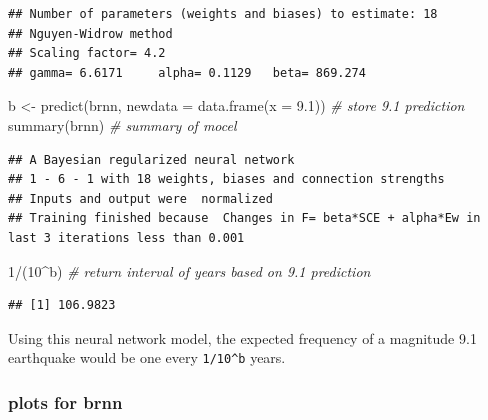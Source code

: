\documentclass[
]{article}
\newenvironment{Shaded}{\begin{snugshade}}{\end{snugshade}}
\newcommand{\AttributeTok}[1]{\textcolor[rgb]{0.77,0.63,0.00}{#1}}
\newcommand{\CommentTok}[1]{\textcolor[rgb]{0.56,0.35,0.01}{\textit{#1}}}
\newcommand{\DecValTok}[1]{\textcolor[rgb]{0.00,0.00,0.81}{#1}}
\newcommand{\FloatTok}[1]{\textcolor[rgb]{0.00,0.00,0.81}{#1}}
\newcommand{\FunctionTok}[1]{\textcolor[rgb]{0.00,0.00,0.00}{#1}}
\newcommand{\NormalTok}[1]{#1}
\newcommand{\OtherTok}[1]{\textcolor[rgb]{0.56,0.35,0.01}{#1}}
\newcommand{\SpecialCharTok}[1]{\textcolor[rgb]{0.00,0.00,0.00}{#1}}
\begin{document}
\begin{verbatim}
## Number of parameters (weights and biases) to estimate: 18 
## Nguyen-Widrow method
## Scaling factor= 4.2 
## gamma= 6.6171     alpha= 0.1129   beta= 869.274
\end{verbatim}

\begin{Shaded}
\begin{Highlighting}[]
\NormalTok{b }\OtherTok{\textless{}{-}} \FunctionTok{predict}\NormalTok{(brnn, }\AttributeTok{newdata =} \FunctionTok{data.frame}\NormalTok{(}\AttributeTok{x =} \FloatTok{9.1}\NormalTok{)) }\CommentTok{\# store 9.1 prediction}
\FunctionTok{summary}\NormalTok{(brnn)                                     }\CommentTok{\# summary of mocel}
\end{Highlighting}
\end{Shaded}

\begin{verbatim}
## A Bayesian regularized neural network 
## 1 - 6 - 1 with 18 weights, biases and connection strengths
## Inputs and output were  normalized
## Training finished because  Changes in F= beta*SCE + alpha*Ew in last 3 iterations less than 0.001
\end{verbatim}

\begin{Shaded}
\begin{Highlighting}[]
\DecValTok{1}\SpecialCharTok{/}\NormalTok{(}\DecValTok{10}\SpecialCharTok{\^{}}\NormalTok{b) }\CommentTok{\# return interval of years based on 9.1 prediction}
\end{Highlighting}
\end{Shaded}

\begin{verbatim}
## [1] 106.9823
\end{verbatim}

Using this neural network model, the expected frequency of a magnitude
9.1 earthquake would be one every \texttt{1/10\^{}b} years.

\hypertarget{plots-for-brnn}{%
\subsubsection{plots for brnn}\label{plots-for-brnn}}
\end{document}
